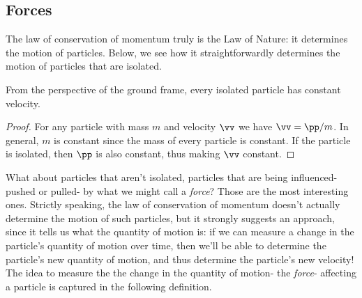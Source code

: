 \documentclass{article}
\begin{document}
\subsection*{Forces}

The law of conservation of momentum truly is the Law of Nature: it determines the motion of particles. Below, we see how it straightforwardly determines the motion of particles that are isolated.

\begin{theorem}
	\label{thm_isolated_particle_constant_velocity}
	From the perspective of the ground frame, every isolated particle has constant velocity. 
\end{theorem}

\begin{proof}
	For any particle with mass $m$ and velocity $\vv$ we have $\vv = \pp/m$. In general, $m$ is constant since the mass of every particle is constant. If the particle is isolated, then $\pp$ is also constant, thus making $\vv$ constant.
\end{proof}

What about particles that aren't isolated, particles that are being influenced- pushed or pulled- by what we might call a \textit{force}? Those are the most interesting ones. Strictly speaking, the law of conservation of momentum doesn't actually determine the motion of such particles, but it strongly suggests an approach, since it tells us what the quantity of motion is: if we can measure a change in the particle's quantity of motion over time, then we'll be able to determine the particle's new quantity of motion, and thus determine the particle's new velocity! The idea to measure the the change in the quantity of motion- the \textit{force}- affecting a particle is captured in the following definition.
\end{document}
